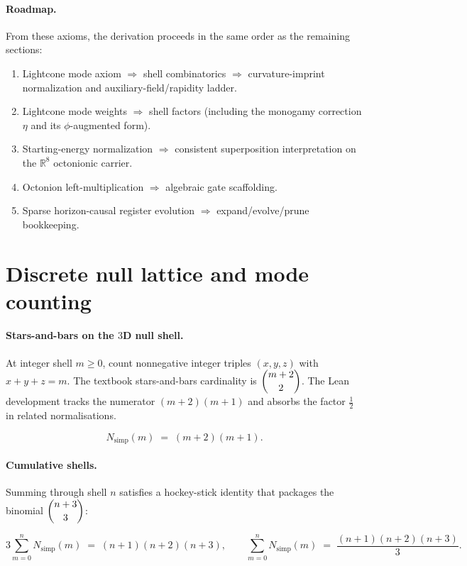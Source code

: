 \documentclass[11pt,a4paper]{article}
\theoremstyle{remark}
\begin{document}
\paragraph{Roadmap.}
From these axioms, the derivation proceeds in the same order as the remaining sections:
\begin{enumerate}
  \item Lightcone mode axiom $\Rightarrow$ shell combinatorics $\Rightarrow$ curvature-imprint normalization and auxiliary-field/rapidity ladder.
  \item Lightcone mode weights $\Rightarrow$ shell factors (including the monogamy correction $\eta$ and its $\phi$-augmented form).
  \item Starting-energy normalization $\Rightarrow$ consistent superposition interpretation on the $\mathbb{R}^8$ octonionic carrier.
  \item Octonion left-multiplication $\Rightarrow$ algebraic gate scaffolding.
  \item Sparse horizon-causal register evolution $\Rightarrow$ expand/evolve/prune bookkeeping.
\end{enumerate}

\section{Discrete null lattice and mode counting}

\paragraph{Stars-and-bars on the $3$D null shell.}
At integer shell $m\ge 0$, count nonnegative integer triples $(x,y,z)$ with $x+y+z=m$. The textbook stars-and-bars cardinality is $\dbinom{m+2}{2}$. The Lean development tracks the numerator $(m+2)(m+1)$ and absorbs the factor $\tfrac12$ in related normalisations.

\begin{equation}
  N_{\mathrm{simp}}(m) \;=\; (m+2)(m+1).
\end{equation}

\paragraph{Cumulative shells.}
Summing through shell $n$ satisfies a hockey-stick identity that packages the binomial $\dbinom{n+3}{3}$:

\begin{equation}
  3\sum_{m=0}^{n} N_{\mathrm{simp}}(m) \;=\; (n+1)(n+2)(n+3),
  \qquad
  \sum_{m=0}^{n} N_{\mathrm{simp}}(m) \;=\; \frac{(n+1)(n+2)(n+3)}{3}.
\end{equation}
\end{document}

